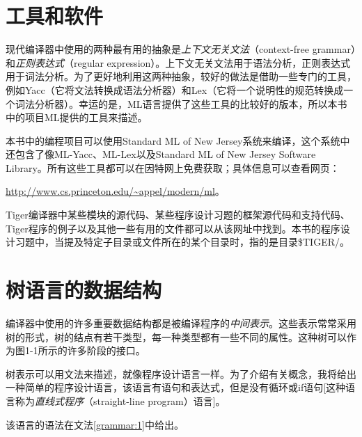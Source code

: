 \documentclass[cn,11pt,chinese]{elegantbook}
\begin{document}
\section{工具和软件}

现代编译器中使用的两种最有用的抽象是\textit{上下文无关文法}（context-free grammar）和\textit{正则表达式}（regular expression）。上下文无关文法用于语法分析，正则表达式用于词法分析。为了更好地利用这两种抽象，较好的做法是借助一些专门的工具，例如Yacc（它将文法转换成语法分析器）和Lex（它将一个说明性的规范转换成一个词法分析器）。幸运的是，ML语言提供了这些工具的比较好的版本，所以本书中的项目ML提供的工具来描述。

本书中的编程项目可以使用Standard ML of New Jersey系统来编译，这个系统中还包含了像ML-Yacc、ML-Lex以及Standard ML of New Jersey Software Library。所有这些工具都可以在因特网上免费获取；具体信息可以查看网页：

\href{http://www.cs.princeton.edu/\textasciitilde appel/modern/ml}{http://www.cs.princeton.edu/\textasciitilde appel/modern/ml}。

Tiger编译器中某些模块的源代码、某些程序设计习题的框架源代码和支持代码、Tiger程序的例子以及其他一些有用的文件都可以从该网址中找到。本书的程序设计习题中，当提及特定子目录或文件所在的某个目录时，指的是目录\$TIGER/。

\section{树语言的数据结构}

编译器中使用的许多重要数据结构都是被编译程序的\textit{中间表示}。这些表示常常采用树的形式，树的结点有若干类型，每一种类型都有一些不同的属性。这种树可以作为图1-1所示的许多阶段的接口。

树表示可以用文法来描述，就像程序设计语言一样。为了介绍有关概念，我将给出一种简单的程序设计语言，该语言有语句和表达式，但是没有循环或if语句[这种语言称为\textit{直线式程序}（straight-line program）语言]。

该语言的语法在文法\ref{grammar:1}中给出。
\end{document}
